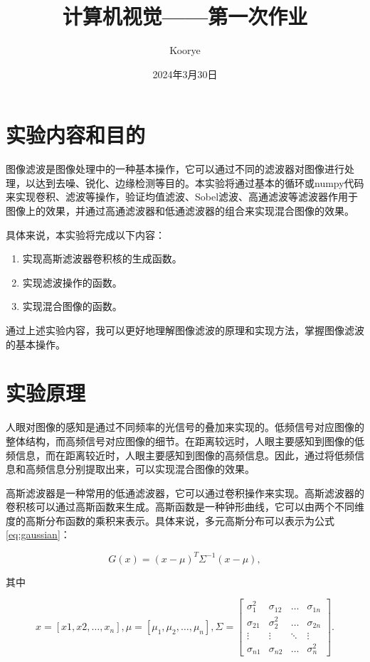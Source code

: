 \documentclass{article}
\title{计算机视觉——第一次作业}
\author{Koorye}
\date{2024年3月30日}
\begin{document}
\maketitle

\section{实验内容和目的}

图像滤波是图像处理中的一种基本操作，它可以通过不同的滤波器对图像进行处理，以达到去噪、锐化、边缘检测等目的。本实验将通过基本的循环或numpy代码来实现卷积、滤波等操作，验证均值滤波、Sobel滤波、高通滤波等滤波器作用于图像上的效果，并通过高通滤波器和低通滤波器的组合来实现混合图像的效果。

具体来说，本实验将完成以下内容：

\begin{enumerate}
    \item 实现高斯滤波器卷积核的生成函数。
    \item 实现滤波操作的函数。
    \item 实现混合图像的函数。
\end{enumerate}

通过上述实验内容，我可以更好地理解图像滤波的原理和实现方法，掌握图像滤波的基本操作。

\section{实验原理}

人眼对图像的感知是通过不同频率的光信号的叠加来实现的。低频信号对应图像的整体结构，而高频信号对应图像的细节。在距离较远时，人眼主要感知到图像的低频信息，而在距离较近时，人眼主要感知到图像的高频信息。因此，通过将低频信息和高频信息分别提取出来，可以实现混合图像的效果。

高斯滤波器是一种常用的低通滤波器，它可以通过卷积操作来实现。高斯滤波器的卷积核可以通过高斯函数来生成。高斯函数是一种钟形曲线，它可以由两个不同维度的高斯分布函数的乘积来表示。具体来说，多元高斯分布可以表示为公式\ref{eq:gaussian}：

\begin{equation}
    G(x) = (x - \mu)^T \Sigma^{-1} (x - \mu),
    \label{eq:gaussian}
\end{equation}

其中

\begin{equation}
    x=[x1,x2,\dots,x_n], 
    \mu=[\mu_1,\mu_2,\dots,\mu_n],
    \Sigma=\begin{bmatrix}
        \sigma_1^2 & \sigma_{12} & \dots & \sigma_{1n} \\
        \sigma_{21} & \sigma_2^2 & \dots & \sigma_{2n} \\
        \vdots & \vdots & \ddots & \vdots \\
        \sigma_{n1} & \sigma_{n2} & \dots & \sigma_n^2
    \end{bmatrix}.
\end{equation}
\end{document}
